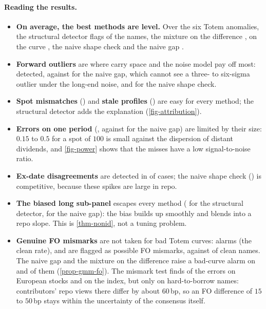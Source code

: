 \paragraph{Reading the results.}
\begin{itemize}
\item \textbf{On average, the best methods are level.} Over the six Totem anomalies, the structural detector flags
\vMeanStruct{} of the names, the mixture on the difference \vMeanGmmDiff, on the curve \vMeanGmmCurve, the naive shape
check \vMeanShape{} and the naive gap \vMeanNaive.
\item \textbf{Forward outliers} are where carry space and the noise model pay off most: \vFwdStruct{} detected, against
\vFwdNaive{} for the naive gap, which cannot see a three- to six-sigma outlier under the long-end noise, and
\vFwdShape{} for the naive shape check.
\item \textbf{Spot mismatches} (\vSpotStruct) and \textbf{stale profiles} (\vSeasonStruct) are easy for every method;
the structural detector adds the explanation (\cref{fig-attribution}).
\item \textbf{Errors on one period} (\vBucketStruct, against \vBucketNaive{} for the naive gap) are limited by their
size: $\num{0.15}$ to $\num{0.5}$ for a spot of $100$ is small against the dispersion of distant dividends, and
\cref{fig-power} shows that the misses have a low signal-to-noise ratio.
\item \textbf{Ex-date disagreements} are detected in \vTimingStruct{} of cases; the naive shape check (\vTimingShape) is
competitive, because these spikes are large in repo.
\item \textbf{The biased long sub-panel} escapes every method (\vPanelStruct{} for the structural detector,
\vPanelNaive{} for the naive gap): the bias builds up smoothly and blends into a repo slope. This is
\cref{thm-nonid}, not a tuning problem.
\item \textbf{Genuine FO mismarks} are not taken for bad Totem curves: \vFoStruct{} alarms (the clean rate), and
\vFoMismark{} are flagged as possible FO mismarks, against \vFoClean{} of clean names. The naive gap and the mixture on
the difference raise a bad-curve alarm on \vFoNaive{} and \vFoGmmDiff{} of them (\cref{prop-gmm-fo}). The mismark test
finds \vFoMismarkEuStock{} of the errors on European stocks and \vFoMismarkIndex{} on the index, but only
\vFoMismarkHtb{} on hard-to-borrow names: contributors' repo views there differ by about $60$\,bp, so an FO difference
of $15$ to $50$\,bp stays within the uncertainty of the consensus itself.

\end{itemize}
